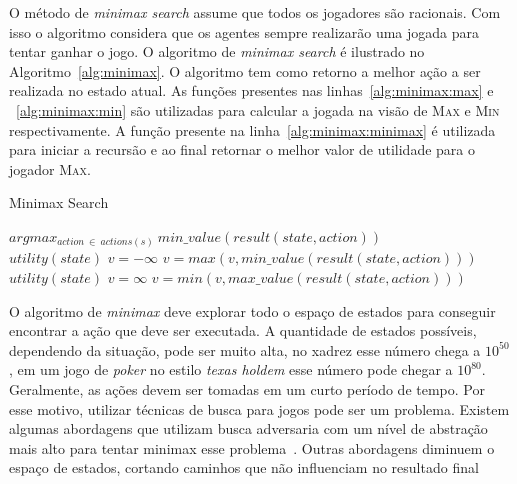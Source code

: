 O método de \textit{minimax search} assume que todos os jogadores são racionais.
Com isso o algoritmo considera que os agentes sempre realizarão uma jogada para tentar ganhar o jogo.
O algoritmo de \textit{minimax search} é ilustrado no Algoritmo~\ref{alg:minimax}. 
O algoritmo tem como retorno a melhor ação a ser realizada no estado atual. 
As funções presentes nas linhas~\ref{alg:minimax:max} e ~\ref{alg:minimax:min} são utilizadas para calcular a jogada na visão de \textsc{Max} e \textsc{Min} respectivamente.
A função presente na linha~\ref{alg:minimax:minimax} é utilizada para iniciar a recursão e ao final retornar o melhor valor de utilidade para o jogador \textsc{Max}.

\begin{algorithm}
	\caption{Minimax Search}
	\label{alg:minimax}
	\begin{algorithmic}[1]	
		 \label{alg:minimax:minimax}
		\State \Return $arg max_{action~ \in~ actions(s)}~ min\_value(result(state,  action)) $
		\EndFunction \\
		\label{alg:minimax:max}
		\State	\Return $utility(state)$
		\EndIf
		\State $v = -\infty$
		\State $v = max(v, min\_value(result(state,action)))$
		\EndFor	
		\EndFunction \\
		\label{alg:minimax:min}
		\State	\Return $utility(state)$
		\EndIf
		\State $v = \infty$
		\State $v = min(v, max\_value(result(state,action)))$
		\EndFor	
		\EndFunction
	\end{algorithmic}
\end{algorithm}


O algoritmo de \textit{minimax} deve explorar todo o espaço de estados para conseguir encontrar a ação que deve ser executada. 
A quantidade de estados possíveis, dependendo da situação, pode ser muito alta, no xadrez esse número chega a $10^{50}$, em um jogo de \textit{poker} no estilo \textit{texas holdem} esse número pode chegar a $10^{80}$. 
Geralmente, as ações devem ser tomadas em um curto período de tempo. 
Por esse motivo, utilizar técnicas de busca para jogos pode ser um problema. 
Existem algumas abordagens que utilizam busca adversaria com um nível de abstração mais alto para tentar minimax esse problema~\cite{ontanon2013survey}. Outras abordagens diminuem o espaço de estados, cortando caminhos que não influenciam no resultado final~\cite[Capítulo 5]{intelligence2003modern}